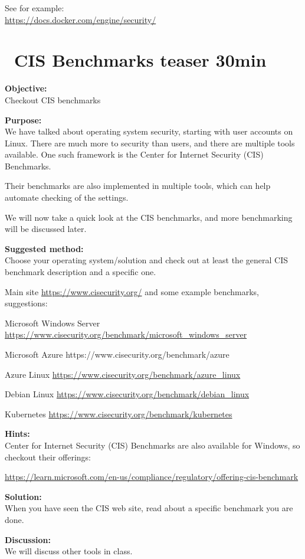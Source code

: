 \documentclass[a4paper,11pt,notitlepage]{report}
\begin{document}
See for example: \\
\url{https://docs.docker.com/engine/security/}




\chapter{\faExclamationTriangle\ CIS Benchmarks teaser 30min}
\label{ex:CIS-benchmarks-teaser}

{\bf Objective:}\\
Checkout CIS benchmarks

{\bf Purpose:}\\
We have talked about operating system security, starting with user accounts on Linux. There are much more to security than users, and there are multiple tools available. One such framework is the Center for Internet Security (CIS) Benchmarks.

Their benchmarks are also implemented in multiple tools, which can help automate checking of the settings.

We will now take a quick look at the CIS benchmarks, and more benchmarking will be discussed later.

{\bf Suggested method:}\\
Choose your operating system/solution and check out at least the general CIS benchmark description and a specific one.

Main site \url{https://www.cisecurity.org/} and some example benchmarks, suggestions:

\begin{list2}
\item Microsoft Windows Server   \url{https://www.cisecurity.org/benchmark/microsoft_windows_server}
\item Microsoft Azure https://www.cisecurity.org/benchmark/azure
\item Azure Linux \url{https://www.cisecurity.org/benchmark/azure_linux}
\item Debian Linux \url{https://www.cisecurity.org/benchmark/debian_linux}
\item Kubernetes \url{https://www.cisecurity.org/benchmark/kubernetes}
\end{list2}

{\bf Hints:}\\
Center for Internet Security (CIS) Benchmarks are also available for Windows, so checkout their offerings:

\url{https://learn.microsoft.com/en-us/compliance/regulatory/offering-cis-benchmark}


{\bf Solution:}\\
When you have seen the CIS web site, read about a specific benchmark you are done.


{\bf Discussion:}\\
We will discuss other tools in class.
\end{document}
